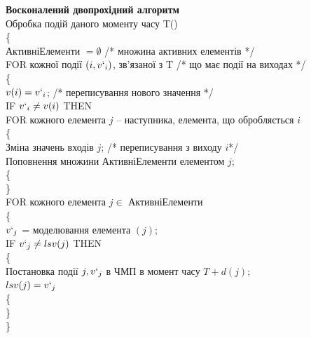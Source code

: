 \documentclass[12pt,a4paper]{article}
\begin{document}
\textbf{Восконалений двопрохідний алгоритм}\\
Обробка подій даного моменту часу T()\\
\{\\
\-\hspace{1cm}  АктивніЕлементи $=\emptyset$ /* множина активних елементів */\\
\-\hspace{1cm}  FOR кожної події $(i, v`_i)$, зв’язаної з T /* що має події на виходах */\\
\-\hspace{1cm}  \{\\
\-\hspace{1cm}    $v(i) = v`_i$; /* переписування нового значення */\\
\-\hspace{1cm}    IF $v`_i \neq v(i)$ THEN\\
\-\hspace{1cm}    FOR кожного елемента $j$ -- наступника, елемента, що обробляється $i$\\
\-\hspace{1cm}    \{\\
\-\hspace{1cm}      Зміна значень входів $j$; /* переписування з виходу $i$*/\\
\-\hspace{1cm}      Поповнення множини АктивніЕлементи елементом $j$;\\
\-\hspace{1cm}    \{\\
\-\hspace{1cm}  \}\\
\-\hspace{1cm}  FOR кожного елемента $j\in$ АктивніЕлементи\\
\-\hspace{1cm}  \{\\
\-\hspace{1cm}    $v`_j$ = моделювання елемента $(j)$;\\
\-\hspace{1cm}    IF $v`_j \neq lsv(j)$ THEN\\
\-\hspace{1cm}    \{\\
\-\hspace{1cm}      Постановка події $j, v`_j$ в ЧМП в момент часу $T+d(j)$;\\
\-\hspace{1cm}      $lsv(j)=v`_j$\\
\-\hspace{1cm}    \{\\
\-\hspace{1cm}  \}\\
\}
\end{document}
